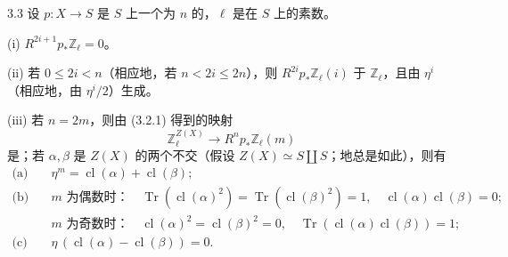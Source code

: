 \begin{SGAresult}{}{3.3}
设 $p:X\to S$ 是 $S$ 上一个为 $n$ 的，$\ell$ 是在 $S$ 上的素数。

\noindent (i) $R^{2i+1}p_*\mathbb Z_\ell=0$。

\noindent (ii) 若 $0\le2i<n$（相应地，若 $n<2i\le2n$），则 $R^{2i}p_*\mathbb Z_\ell(i)$ 于 $\mathbb Z_\ell$，且由 $\eta^i$（相应地，由 $\eta^i/2$）生成。

\noindent (iii) 若 $n=2m$，则由 (3.2.1) 得到的映射
\[
\mathbb Z_\ell^{Z(X)}\longrightarrow R^np_*\mathbb Z_\ell(m)\tag{3.2.1}
\]
是；若 $\alpha,\beta$ 是 $Z(X)$ 的两个不交（假设 $Z(X)\simeq S\amalg S$；地总是如此），则有
\[
\begin{aligned}
\text{(a)}\quad&\eta^m=\operatorname{cl}(\alpha)+\operatorname{cl}(\beta);\\
\text{(b)}\quad&m\text{ 为偶数时：}\quad
\operatorname{Tr}(\operatorname{cl}(\alpha)^2)=\operatorname{Tr}(\operatorname{cl}(\beta)^2)=1,
\quad\operatorname{cl}(\alpha)\operatorname{cl}(\beta)=0;\\
&m\text{ 为奇数时：}\quad\operatorname{cl}(\alpha)^2=\operatorname{cl}(\beta)^2=0,
\quad\operatorname{Tr}(\operatorname{cl}(\alpha)\operatorname{cl}(\beta))=1;\\
\text{(c)}\quad&\eta\,(\operatorname{cl}(\alpha)-\operatorname{cl}(\beta))=0.
\end{aligned}
\]
\end{SGAresult}
